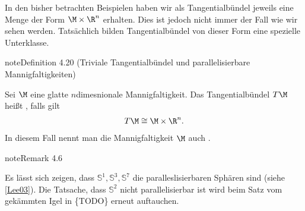 \documentclass[letterpaper,10pt,german]{jupyterBook}
\begin{document}
\sphinxAtStartPar
In den bisher betrachten Beispielen haben wir als Tangentialbündel jeweils eine Menge der Form \(\M\times \R^n\) erhalten.
Dies ist jedoch nicht immer der Fall wie wir sehen werden.
Tatsächlich bilden Tangentialbündel von dieser Form eine spezielle Unterklasse.
\label{manifolds/tangential:definition-22}
\begin{sphinxadmonition}{note}{Definition 4.20 (Triviale Tangentialbündel und parallelisierbare Mannigfaltigkeiten)}



\sphinxAtStartPar
Sei \(\M\) eine glatte \(n\)\sphinxhyphen{}dimesnionale Mannigfaltigkeit.
Das Tangentialbündel \(T\M\) heißt , falls gilt
\begin{equation*}
\begin{split}T\M\cong \M\times\R^n.\end{split}
\end{equation*}
\sphinxAtStartPar
In diesem Fall nennt man die Mannigfaltigkeit \(\M\) auch .
\end{sphinxadmonition}
\label{manifolds/tangential:remark-23}
\begin{sphinxadmonition}{note}{Remark 4.6}



\sphinxAtStartPar
Es lässt sich zeigen, dass \(\mathbb{S}^1, \mathbb{S}^3,\mathbb{S}^7\) die  paralleslisierbaren Sphären sind (siehe {[}\hyperlink{cite.references:id18}{Lee03}{]}).
Die Tatsache, dass \(\mathbb{S}^2\) nicht parallelisierbar ist wird beim Satz vom gekämmten Igel in \{TODO\} erneut auftauchen.
\end{sphinxadmonition}
\end{document}
